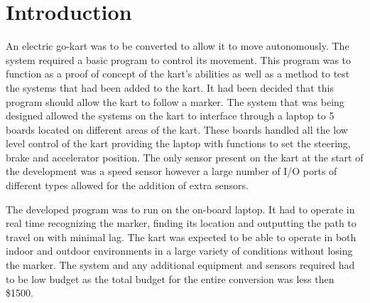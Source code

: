\section{Introduction}

An electric go-kart was to be converted to allow it to move autonomously. The system required a basic program to control its movement. This program was to function as a proof of concept of the kart’s abilities as well as a method to test the systems that had been added to the kart. It had been decided that this program should allow the kart to follow a marker. The system that was being designed allowed the systems on the kart to interface through a laptop to 5 boards located on different areas of the kart. These boards handled all the low level control of the kart providing the laptop with functions to set the steering, brake and accelerator position. The only sensor present on the kart at the start of the development was a speed sensor however a large number of I/O ports of different types allowed for the addition of extra sensors.  

The developed program was to run on the on-board laptop. It had to operate in real time recognizing the marker, finding its location and outputting the path to travel on with minimal lag. The kart was expected to be able to operate in both indoor and outdoor environments in a large variety of conditions without losing the marker. The system and any additional equipment and sensors required had to be low budget as the total budget for the entire conversion was less then \$1500.